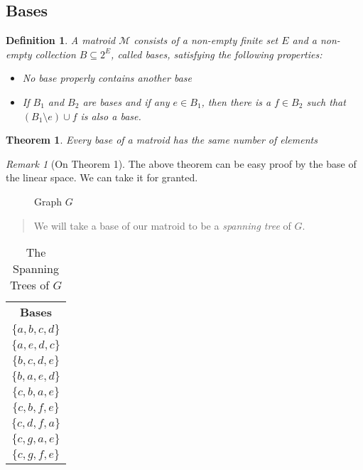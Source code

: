 \documentclass[a4paper, 11pt]{report}
\newtheorem{definition}{Definition}
\newtheorem{theorem}{Theorem}
\theoremstyle{remark}
\newtheorem*{remark}{Remark}
\begin{document}
\subsection{Bases}
    \begin{definition}
        A matroid $\mathcal{M}$ consists of a non-empty finite set $E$ and a non-empty collection $B\subseteq 2^E$, called bases, satisfying the following properties:
        \begin{itemize}
            \item[i] No base properly contains another base
            \item[ii] If $B_1$ and $B_2$ are bases and if any $e\in B_1$, then there is a $f\in B_2$ such that $(B_1\setminus e)\cup f$ is also a base.
        \end{itemize}
    \end{definition}
    \begin{theorem}
        Every base of a matroid has the same number of elements  
    \end{theorem}
    \begin{remark}[On Theorem 1]
        The above theorem can be easy proof by the base of the linear space. We can take it for granted.
    \end{remark}
    \begin{figure}[H]
        \centering
        
        \caption{Graph $G$}
    \end{figure}
    \begin{quote}
        We will take a base of our matroid to be a \emph{spanning tree} of $G$.
    \end{quote}
    \begin{table}[h]
        \centering
        \begin{tabular}{c}
            \multicolumn{1}{c}{\Large\textbf{Bases}}\\
            \cmidrule(lr){1-1}
            $\{a,b,c,d\}$\\
            $\{a,e,d,c\}$\\
            $\{b,c,d,e\}$\\
            $\{b,a,e,d\}$\\
            $\{c,b,a,e\}$\\
            $\{c,b,f,e\}$\\
            $\{c,d,f,a\}$\\
            $\{c,g,a,e\}$\\
            $\{c,g,f,e\}$\\
        \end{tabular}
        \caption{The Spanning Trees of $G$}
        \label{tab:spanning-trees-G}
    \end{table}
\end{document}
